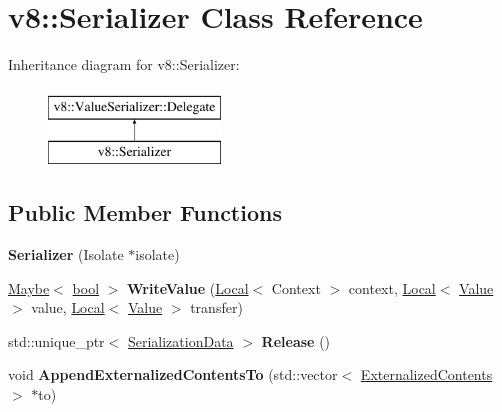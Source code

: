 \hypertarget{classv8_1_1Serializer}{}\section{v8\+:\+:Serializer Class Reference}
\label{classv8_1_1Serializer}
Inheritance diagram for v8\+:\+:Serializer\+:\begin{figure}[H]
\begin{center}
\leavevmode
\includegraphics[height=2.000000cm]{classv8_1_1Serializer}
\end{center}
\end{figure}
\subsection*{Public Member Functions}
\begin{DoxyCompactItemize}
\item 
\mbox{\label{classv8_1_1Serializer_a4cf48df134b20c6f157f5aeaa8ee91ad}} 
{\bfseries Serializer} (Isolate $\ast$isolate)
\item 
\mbox{\label{classv8_1_1Serializer_a8d2e55c1cbd58dfc09dc66d6d36e1e25}} 
\mbox{\hyperlink{classv8_1_1Maybe}{Maybe}}$<$ \mbox{\hyperlink{classbool}{bool}} $>$ {\bfseries Write\+Value} (\mbox{\hyperlink{classv8_1_1Local}{Local}}$<$ Context $>$ context, \mbox{\hyperlink{classv8_1_1Local}{Local}}$<$ \mbox{\hyperlink{classv8_1_1Value}{Value}} $>$ value, \mbox{\hyperlink{classv8_1_1Local}{Local}}$<$ \mbox{\hyperlink{classv8_1_1Value}{Value}} $>$ transfer)
\item 
\mbox{\label{classv8_1_1Serializer_a9d18106c1908b9d3f0242cf84a3e302c}} 
std\+::unique\+\_\+ptr$<$ \mbox{\hyperlink{classv8_1_1SerializationData}{Serialization\+Data}} $>$ {\bfseries Release} ()
\item 
\mbox{\label{classv8_1_1Serializer_ad882ae6d842079748f92d99b4f1a3442}} 
void {\bfseries Append\+Externalized\+Contents\+To} (std\+::vector$<$ \mbox{\hyperlink{classv8_1_1ExternalizedContents}{Externalized\+Contents}} $>$ $\ast$to)
\end{DoxyCompactItemize}
